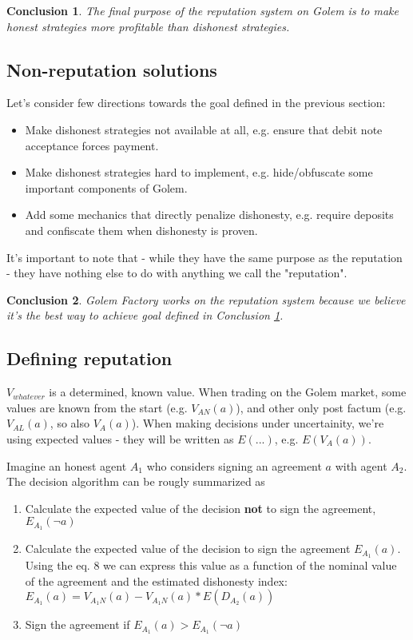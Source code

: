 \documentclass{article}
\newtheorem{conclusion}{Conclusion}[section]
\begin{document}
\begin{conclusion}

The final purpose of the reputation system on Golem is to make honest strategies more profitable than dishonest strategies.

\label{main purpose conclusion}
\end{conclusion}


\subsection{Non-reputation solutions}

Let's consider few directions towards the goal defined in the previous section:

\begin{itemize}
\item Make dishonest strategies not available at all, e.g. ensure that debit note acceptance forces payment.
\item Make dishonest strategies hard to implement, e.g. hide/obfuscate some important components of Golem.
\item Add some mechanics that directly penalize dishonesty, e.g. require deposits and confiscate them when dishonesty is proven.
\end{itemize}

It's important to note that - while they have the same purpose as the reputation - they have nothing else to do with anything we call the "reputation".

\begin{conclusion}
Golem Factory works on the reputation system because we believe it's the best way to achieve goal defined in Conclusion \ref{main purpose conclusion}.
\end{conclusion}

\subsection{Defining reputation}

$V_{whatever}$ is a determined, known value. When trading on the Golem market, some values are known from the start (e.g. $V_{AN}(a)$), 
and other only post factum (e.g. $V_{AL}(a)$, so also $V_A(a)$).
When making decisions under uncertainity, we're using expected values - they will be written as $E(...)$, e.g. $E(V_A(a))$.

Imagine an honest agent $A_1$ who considers signing an agreement $a$ with agent $A_2$. The decision algorithm can be rougly summarized as
\begin{enumerate}
\item Calculate the expected value of the decision \textbf{not} to sign the agreement, $E_{A_1}(\neg a)$
\item Calculate the expected value of the decision to sign the agreement $E_{A_1}(a)$.
    Using the eq. 8 we can express this value as a function of the nominal value of the agreement and the
    estimated dishonesty index: $E_{A_1}(a) = V_{A_1N}(a) - V_{A_1N}(a) * E(D_{A_2}(a))$
\item Sign the agreement if $E_{A_1}(a) > E_{A_1}(\neg a)$
\end{enumerate}
\end{document}
